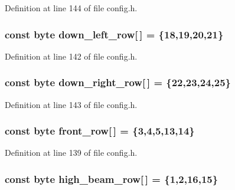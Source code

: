 Definition at line 144 of file config.\+h.

\subsubsection[{\texorpdfstring{down\+\_\+left\+\_\+row}{down_left_row}}]{\setlength{\rightskip}{0pt plus 5cm}const byte down\+\_\+left\+\_\+row\mbox{[}$\,$\mbox{]} = \{18,19,20,21\}}\hypertarget{group__deployment_gaac36c9836edd3a125668213f0fb72b5a}{}\label{group__deployment_gaac36c9836edd3a125668213f0fb72b5a}


Definition at line 142 of file config.\+h.

\subsubsection[{\texorpdfstring{down\+\_\+right\+\_\+row}{down_right_row}}]{\setlength{\rightskip}{0pt plus 5cm}const byte down\+\_\+right\+\_\+row\mbox{[}$\,$\mbox{]} = \{22,23,24,25\}}\hypertarget{group__deployment_gadbf10ff9ee353128c568e07c32b1ffa9}{}\label{group__deployment_gadbf10ff9ee353128c568e07c32b1ffa9}


Definition at line 143 of file config.\+h.

\subsubsection[{\texorpdfstring{front\+\_\+row}{front_row}}]{\setlength{\rightskip}{0pt plus 5cm}const byte front\+\_\+row\mbox{[}$\,$\mbox{]} = \{3,4,5,13,14\}}\hypertarget{group__deployment_ga5009aa0cbe6b32a72b085489b027800e}{}\label{group__deployment_ga5009aa0cbe6b32a72b085489b027800e}


Definition at line 139 of file config.\+h.

\subsubsection[{\texorpdfstring{high\+\_\+beam\+\_\+row}{high_beam_row}}]{\setlength{\rightskip}{0pt plus 5cm}const byte high\+\_\+beam\+\_\+row\mbox{[}$\,$\mbox{]} = \{1,2,16,15\}}\hypertarget{group__deployment_ga1ecea646e1c5dcdfc643287a5f2041bb}{}\label{group__deployment_ga1ecea646e1c5dcdfc643287a5f2041bb}


